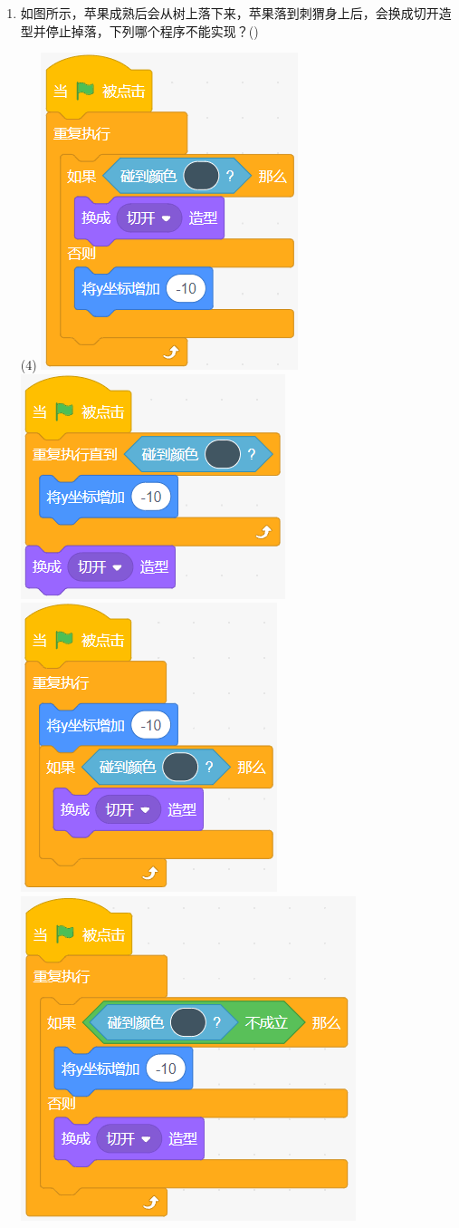 \documentclass[10pt, a4paper]{article}
\newcommand{\hq}{\hfill(\qquad)}
\begin{document}
\begin{enumerate}
        \item 如图所示，苹果成熟后会从树上落下来，苹果落到刺猬身上后，会换成切开造型并停止掉落，下列哪个程序不能实现？\hq
        \begin{tasks}(4)
            \task \includegraphics[width=.15\textwidth]{figure/23a.png}
            \task \includegraphics[width=.18\textwidth]{figure/23b.png}
            \task \includegraphics[width=.165\textwidth]{figure/23c.png}
            \task \includegraphics[width=.18\textwidth]{figure/23d.png}
        \end{tasks}


\end{enumerate}
\end{document}
